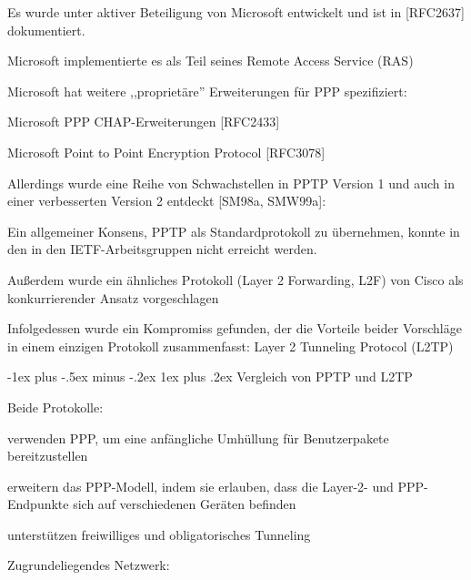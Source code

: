 \documentclass[a4paper]{article}
\makeatletter
\renewcommand{\subsubsection}{\@startsection{subsubsection}{3}{0mm}%
 {-1ex plus -.5ex minus -.2ex}%
 {1ex plus .2ex}%
 {\normalfont\small\bfseries}}
\makeatother
\begin{document}
\begin{multicols}{3}
\begin{itemize*}
            \begin{itemize*}
                  \item Es wurde unter aktiver Beteiligung von Microsoft entwickelt und ist in {[}RFC2637{]} dokumentiert.
                  \item Microsoft implementierte es als Teil seines Remote Access Service (RAS)
            \end{itemize*}
            \item
            Microsoft hat weitere ,,proprietäre'' Erweiterungen für PPP
            spezifiziert:

            \begin{itemize*}
                  \item Microsoft PPP CHAP-Erweiterungen {[}RFC2433{]}
                  \item Microsoft Point to Point Encryption Protocol {[}RFC3078{]}
            \end{itemize*}
            \item
            Allerdings wurde eine Reihe von Schwachstellen in PPTP Version 1 und
            auch in einer verbesserten Version 2 entdeckt {[}SM98a, SMW99a{]}:

            \begin{itemize*}
                  \item Ein allgemeiner Konsens, PPTP als Standardprotokoll zu übernehmen, konnte in den in den IETF-Arbeitsgruppen nicht erreicht werden.
                  \item Außerdem wurde ein ähnliches Protokoll (Layer 2 Forwarding, L2F) von Cisco als konkurrierender Ansatz vorgeschlagen
                  \item Infolgedessen wurde ein Kompromiss gefunden, der die Vorteile beider Vorschläge in einem einzigen Protokoll zusammenfasst: Layer 2 Tunneling Protocol (L2TP)
            \end{itemize*}
      \end{itemize*}


      \subsubsection{Vergleich von PPTP und
            L2TP}

      \begin{itemize*}
            \item
            Beide Protokolle:

            \begin{itemize*}
                  \item verwenden PPP, um eine anfängliche Umhüllung für Benutzerpakete bereitzustellen
                  \item erweitern das PPP-Modell, indem sie erlauben, dass die Layer-2- und PPP-Endpunkte sich auf verschiedenen Geräten befinden
                  \item unterstützen freiwilliges und obligatorisches Tunneling
            \end{itemize*}
            \item
            Zugrundeliegendes Netzwerk:


\end{itemize*}
\end{multicols}
\end{document}
